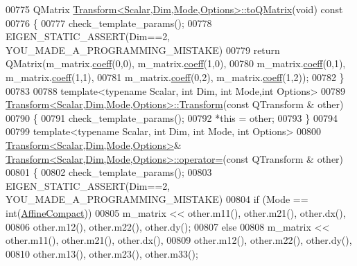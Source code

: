 \begin{DoxyCode}
00775 QMatrix \hyperlink{group___geometry___module_class_eigen_1_1_transform}{Transform<Scalar,Dim,Mode,Options>::toQMatrix}(\textcolor{keywordtype}{void})\textcolor{keyword}{
       const}
00776 \textcolor{keyword}{}\{
00777   check\_template\_params();
00778   EIGEN\_STATIC\_ASSERT(Dim==2, YOU\_MADE\_A\_PROGRAMMING\_MISTAKE)
00779   \textcolor{keywordflow}{return} QMatrix(m\_matrix.\hyperlink{class_eigen_1_1_plain_object_base_afbfc12954f16d21aedb7bd839f64a278}{coeff}(0,0), m\_matrix.\hyperlink{class_eigen_1_1_plain_object_base_afbfc12954f16d21aedb7bd839f64a278}{coeff}(1,0),
00780                  m\_matrix.\hyperlink{class_eigen_1_1_plain_object_base_afbfc12954f16d21aedb7bd839f64a278}{coeff}(0,1), m\_matrix.\hyperlink{class_eigen_1_1_plain_object_base_afbfc12954f16d21aedb7bd839f64a278}{coeff}(1,1),
00781                  m\_matrix.\hyperlink{class_eigen_1_1_plain_object_base_afbfc12954f16d21aedb7bd839f64a278}{coeff}(0,2), m\_matrix.\hyperlink{class_eigen_1_1_plain_object_base_afbfc12954f16d21aedb7bd839f64a278}{coeff}(1,2));
00782 \}
00783 
00788 \textcolor{keyword}{template}<\textcolor{keyword}{typename} Scalar, \textcolor{keywordtype}{int} Dim, \textcolor{keywordtype}{int} Mode,\textcolor{keywordtype}{int} Options>
00789 \hyperlink{group___geometry___module_a79b94ccee0f7871610fa2fa084e0fd59}{Transform<Scalar,Dim,Mode,Options>::Transform}(\textcolor{keyword}{const} QTransform
      & other)
00790 \{
00791   check\_template\_params();
00792   *\textcolor{keyword}{this} = other;
00793 \}
00794 
00799 \textcolor{keyword}{template}<\textcolor{keyword}{typename} Scalar, \textcolor{keywordtype}{int} Dim, \textcolor{keywordtype}{int} Mode, \textcolor{keywordtype}{int} Options>
00800 \hyperlink{group___geometry___module_class_eigen_1_1_transform}{Transform<Scalar,Dim,Mode,Options>}& 
      \hyperlink{group___geometry___module_class_eigen_1_1_transform}{Transform<Scalar,Dim,Mode,Options>::operator=}(\textcolor{keyword}{const} QTransform
      & other)
00801 \{
00802   check\_template\_params();
00803   EIGEN\_STATIC\_ASSERT(Dim==2, YOU\_MADE\_A\_PROGRAMMING\_MISTAKE)
00804   \textcolor{keywordflow}{if} (Mode == \textcolor{keywordtype}{int}(\hyperlink{group__enums_ggaee59a86102f150923b0cac6d4ff05107aa30a06b60d218b709020972df47de2b0}{AffineCompact}))
00805     m\_matrix << other.m11(), other.m21(), other.dx(),
00806                 other.m12(), other.m22(), other.dy();
00807   \textcolor{keywordflow}{else}
00808     m\_matrix << other.m11(), other.m21(), other.dx(),
00809                 other.m12(), other.m22(), other.dy(),
00810                 other.m13(), other.m23(), other.m33();

\end{DoxyCode}
